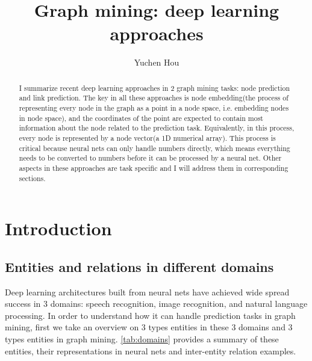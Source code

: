 \documentclass{article}
\begin{document}
\lstset{language=python, tabsize=4}
\title{Graph mining: deep learning approaches}
\author{Yuchen Hou}
\maketitle

\begin{abstract}
	I summarize recent deep learning approaches in 2 graph mining tasks: node prediction and link prediction. The key in all these approaches is node embedding(the process of representing every node in the graph as a point in a node space, i.e. embedding nodes in node space), and the coordinates of the point are expected to contain most information about the node related to the prediction task. Equivalently, in this process, every node is represented by a node vector(a 1D numerical array). This process is critical because neural nets can only handle numbers directly, which means everything needs to be converted to numbers before it can be processed by a neural net. Other aspects in these approaches are task specific and I will address them in corresponding sections.
\end{abstract}

\section{Introduction}

\subsection{Entities and relations in different domains}
Deep learning architectures built from neural nets have achieved wide spread success in 3 domains: speech recognition, image recognition, and natural language processing. In order to understand how it can handle prediction tasks in graph mining, first we take an overview on 3 types entities in these 3 domains and 3 types entities in graph mining. \autoref{tab:domains} provides a summary of these entities, their representations in neural nets and inter-entity relation examples.
\end{document}
